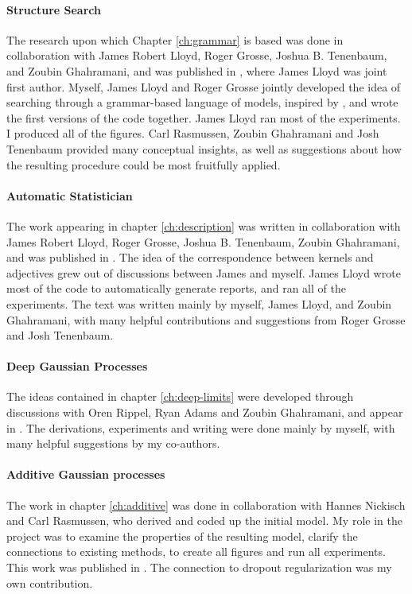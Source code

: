 \paragraph{Structure Search}
The research upon which Chapter \ref{ch:grammar} is based was done in collaboration with James Robert Lloyd, Roger Grosse, Joshua B. Tenenbaum, and Zoubin Ghahramani, and was published in \citep{DuvLloGroetal13}, where James Lloyd was joint first author.
Myself, James Lloyd and Roger Grosse jointly developed the idea of searching through a grammar-based language of \gp{} models, inspired by \citet{grosse2012exploiting}, and wrote the first versions of the code together.
James Lloyd ran most of the experiments.
I produced all of the figures.
Carl Rasmussen, Zoubin Ghahramani and Josh Tenenbaum provided many conceptual insights, as well as suggestions about how the resulting procedure could be most fruitfully applied.

\paragraph{Automatic Statistician} The work appearing in chapter \ref{ch:description} was written in collaboration with James Robert Lloyd, Roger Grosse, Joshua B. Tenenbaum, Zoubin Ghahramani, and was published in \citep{LloDuvGroetal14}.
The idea of the correspondence between kernels and adjectives grew out of discussions between James and myself.
James Lloyd wrote most of the code to automatically generate reports, and ran all of the experiments.
The text was written mainly by myself, James Lloyd, and Zoubin Ghahramani, with many helpful contributions and suggestions from Roger Grosse and Josh Tenenbaum.

\paragraph{Deep Gaussian Processes}
The ideas contained in chapter \ref{ch:deep-limits} were developed through discussions with Oren Rippel, Ryan Adams and Zoubin Ghahramani, and appear in \citep{DuvRipAdaGha14}.  The derivations, experiments and writing were done mainly by myself, with many helpful suggestions by my co-authors.

\paragraph{Additive Gaussian processes}
The work in chapter \ref{ch:additive} was done in collaboration with Hannes Nickisch and Carl Rasmussen, who derived and coded up the initial model.
My role in the project was to examine the properties of the resulting model, clarify the connections to existing methods, to create all figures and run all experiments.
This work was published in \citep{duvenaud2011additive11}.
The connection to dropout regularization was my own contribution.

